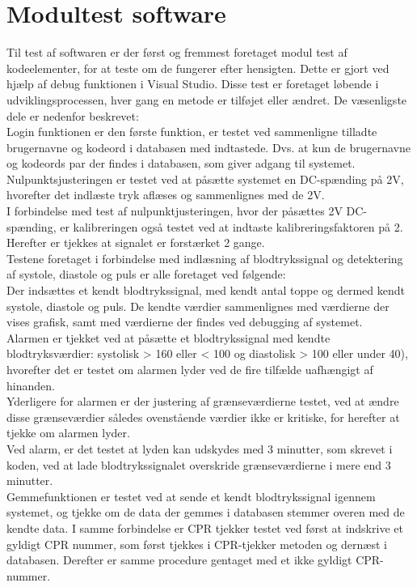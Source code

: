 \section{Modultest software}
Til test af softwaren er der først og fremmest foretaget modul test af  kodeelementer, for at teste om de fungerer efter hensigten. Dette er gjort ved hjælp af debug funktionen i Visual Studio. Disse test er foretaget løbende i udviklingsprocessen, hver gang en metode er tilføjet eller ændret. De væsenligste dele er nedenfor beskrevet: \\[1ex]
Login funktionen er den første funktion, er testet ved sammenligne tilladte brugernavne og kodeord i databasen med indtastede. Dvs. at kun de brugernavne og kodeords par der findes i databasen, som giver adgang til systemet.\\[1ex]
Nulpunktsjusteringen er testet ved at påsætte systemet en DC-spænding på 2V, hvorefter det indlæste tryk aflæses og sammenlignes med de 2V. \\
I forbindelse med test af nulpunktjusteringen, hvor der påsættes 2V DC-spænding, er kalibreringen også testet ved at indtaste kalibreringsfaktoren på 2. Herefter er tjekkes at signalet er forstærket 2 gange.\\[1ex]
Testene foretaget i forbindelse med indlæsning af blodtrykssignal og detektering af systole, diastole og puls er alle foretaget ved følgende:\\
Der indsættes et kendt blodtrykssignal, med kendt antal toppe og dermed kendt systole, diastole og puls. De kendte værdier sammenlignes med værdierne der vises grafisk, samt med værdierne der findes ved debugging af systemet.\\[1ex]
Alarmen er tjekket ved at påsætte et blodtrykssignal med kendte blodtryksværdier: systolisk > 160 eller < 100 og diastolisk > 100 eller under 40), hvorefter det er testet om alarmen lyder ved de fire tilfælde uafhængigt af hinanden.\\ Yderligere for alarmen er der justering af grænseværdierne testet, ved at ændre disse grænseværdier således ovenstående værdier ikke er kritiske, for herefter at tjekke om alarmen lyder.\\ Ved alarm, er det testet at lyden kan udskydes med 3 minutter, som skrevet i koden, ved at lade blodtrykssignalet overskride grænseværdierne i mere end 3 minutter.\\[1ex]
Gemmefunktionen er testet ved at sende et kendt blodtrykssignal igennem systemet, og tjekke om de data der gemmes i databasen stemmer overen med de kendte data. I samme forbindelse er CPR tjekker testet ved først at indskrive et gyldigt CPR nummer, som først tjekkes i CPR-tjekker metoden og dernæst i databasen. Derefter er samme procedure gentaget med et ikke gyldigt CPR-nummer.



